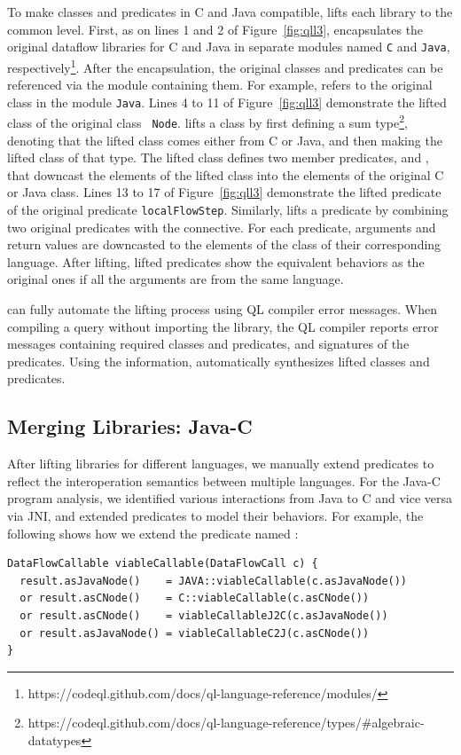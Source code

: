 To make classes and predicates in C and Java compatible, \ours lifts each
library to the common level.  First, as on lines 1 and 2 of
Figure~\ref{fig:qll3}, \ours encapsulates the original dataflow libraries for C
and Java in separate modules named {\tt C} and {\tt Java},
respectively\footnote{https://codeql.github.com/docs/ql-language-reference/modules/}.
After the encapsulation, the original classes and predicates can be referenced
via the module containing them.  For example,  refers to the
original class  in the module {\tt Java}.  Lines 4 to 11 of
Figure~\ref{fig:qll3} demonstrate the lifted class of the original class {\tt
Node}.  \ours lifts a class by first defining a sum
type\footnote{https://codeql.github.com/docs/ql-language-reference/types/\#algebraic-datatypes},
denoting that the lifted class comes either from C or Java, and then making the
lifted class of that type.  The lifted class defines two member predicates,
 and , that downcast the elements of the
lifted class into the elements of the original C or Java class.  Lines 13 to 17
of Figure~\ref{fig:qll3} demonstrate the lifted predicate of the original
predicate {\tt localFlowStep}.  Similarly, \ours lifts a predicate by combining
two original predicates with the  connective. For each predicate,
arguments and return values are downcasted to the elements of the class of
their corresponding language.  After lifting, lifted predicates show the
equivalent behaviors as the original ones if all the arguments are from the
same language.

\ours can fully automate the lifting process using QL compiler error messages.
When compiling a query without importing the library, the QL compiler reports
error messages containing required classes and predicates, and signatures of
the predicates. Using the information, \ours automatically synthesizes lifted
classes and predicates.

\subsection{Merging Libraries: Java-C}\label{sec:merging}
After lifting libraries for different languages, we manually extend predicates
to reflect the interoperation semantics between multiple languages.  For the
Java-C program analysis, we identified various interactions from Java to C and
vice versa via JNI, and extended predicates to model their behaviors.  For
example, the following shows how we extend the  predicate
named :
\begin{lstlisting}[style=codeql,xleftmargin=2.5em]
DataFlowCallable viableCallable(DataFlowCall c) {
  result.asJavaNode()    = JAVA::viableCallable(c.asJavaNode())
  or result.asCNode()    = C::viableCallable(c.asCNode())
  or result.asCNode()    = viableCallableJ2C(c.asJavaNode())
  or result.asJavaNode() = viableCallableC2J(c.asCNode())
}
\end{lstlisting}

